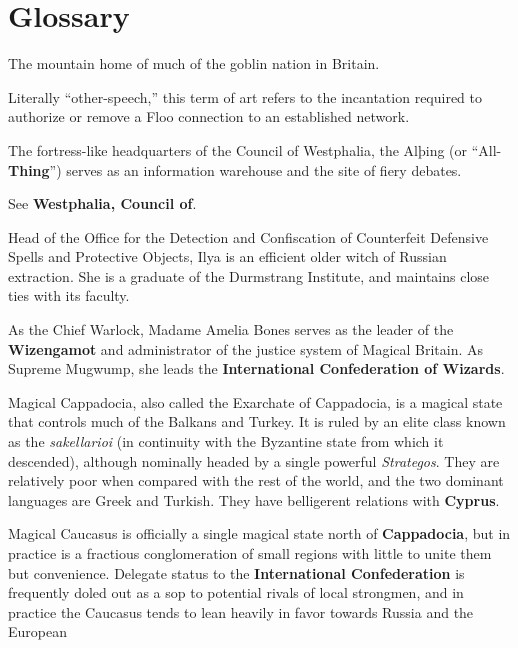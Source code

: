 \hypertarget{glossary}{%
\chapter{Glossary}\label{glossary}}

\begin{description}
\tightlist
\item[Ackle]
The mountain home of much of the goblin nation in Britain.
\item[Agenspræc]
Literally ``other-speech,'' this term of art refers to the incantation
required to authorize or remove a Floo connection to an established
network.
\item[Alþing]
The fortress-like headquarters of the Council of Westphalia, the Alþing
(or ``All-\textbf{Thing}'') serves as an information warehouse and the
site of fiery debates.
\item[Americas]
See \textbf{Westphalia, Council of}.
\item[Bogdanova, Agapa ``Ilya'' Ilyinichna]
Head of the Office for the Detection and Confiscation of Counterfeit
Defensive Spells and Protective Objects, Ilya is an efficient older
witch of Russian extraction. She is a graduate of the Durmstrang
Institute, and maintains close ties with its faculty.
\item[Bones, Amelia]
As the Chief Warlock, Madame Amelia Bones serves as the leader of the
\textbf{Wizengamot} and administrator of the justice system of Magical
Britain. As Supreme Mugwump, she leads the \textbf{International
Confederation of Wizards}.
\item[Cappadocia]
Magical Cappadocia, also called the Exarchate of Cappadocia, is a
magical state that controls much of the Balkans and Turkey. It is ruled
by an elite class known as the \emph{sakellarioi} (in continuity with
the Byzantine state from which it descended), although nominally headed
by a single powerful \emph{Strategos}. They are relatively poor when
compared with the rest of the world, and the two dominant languages are
Greek and Turkish. They have belligerent relations with \textbf{Cyprus}.
\item[Caucasus]
Magical Caucasus is officially a single magical state north of
\textbf{Cappadocia}, but in practice is a fractious conglomeration of
small regions with little to unite them but convenience. Delegate status
to the \textbf{International Confederation} is frequently doled out as a
sop to potential rivals of local strongmen, and in practice the Caucasus
tends to lean heavily in favor towards Russia and the European

\end{description}
